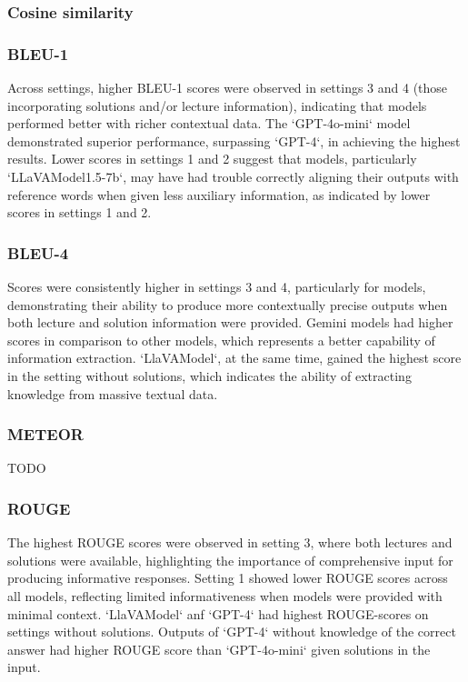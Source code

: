 \documentclass{article}
\begin{document}
\subsubsection{Cosine similarity}
\subsubsection{BLEU-1}
Across settings, higher BLEU-1 scores were observed in settings 3 and 4 (those incorporating solutions and/or lecture information), indicating that models performed better with richer contextual data. The `GPT-4o-mini` model demonstrated superior performance, surpassing `GPT-4`, in achieving the highest results. Lower scores in settings 1 and 2 suggest that models, particularly `LLaVAModel1.5-7b`, may have had trouble correctly aligning their outputs with reference words when given less auxiliary information, as indicated by lower scores in settings 1 and 2. 

\subsubsection{BLEU-4}
Scores were consistently higher in settings 3 and 4, particularly for  models, demonstrating their ability to produce more contextually precise outputs when both lecture and solution information were provided. Gemini models had higher scores in comparison to other models, which represents a better capability of information extraction. `LlaVAModel`, at the same time, gained the highest score in the setting without solutions, which indicates the ability of extracting knowledge from massive textual data.

\subsubsection{METEOR}
TODO

\subsubsection{ROUGE}
The highest ROUGE scores were observed in setting 3, where both lectures and solutions were available, highlighting the importance of comprehensive input for producing informative responses. Setting 1 showed lower ROUGE scores across all models, reflecting limited informativeness when models were provided with minimal context.  `LlaVAModel` anf `GPT-4` had highest ROUGE-scores on settings without solutions. Outputs of `GPT-4` without knowledge of the correct answer had higher ROUGE score than `GPT-4o-mini` given solutions in the input.
\end{document}
